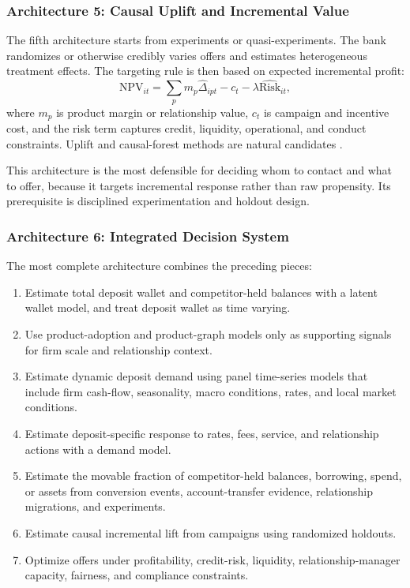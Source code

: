 \documentclass[11pt]{article}
\begin{document}
\subsubsection*{Architecture 5: Causal Uplift and Incremental Value}

The fifth architecture starts from experiments or quasi-experiments. The bank
randomizes or otherwise credibly varies offers and estimates heterogeneous
treatment effects. The targeting rule is then based on expected incremental
profit:
\[
  \mathrm{NPV}_{it}
  =
  \sum_p m_p \widehat{\Delta}_{ipt}
  - c_t
  - \lambda \widehat{\mathrm{Risk}}_{it},
\]
where $m_p$ is product margin or relationship value, $c_t$ is campaign and
incentive cost, and the risk term captures credit, liquidity, operational, and
conduct constraints. Uplift and causal-forest methods are natural candidates
\citep{lo2002true,radcliffe2007uplift,athey2016recursive,wager2018causalforests}.

This architecture is the most defensible for deciding whom to contact and what
to offer, because it targets incremental response rather than raw propensity.
Its prerequisite is disciplined experimentation and holdout design.

\subsubsection*{Architecture 6: Integrated Decision System}

The most complete architecture combines the preceding pieces:

\begin{enumerate}[leftmargin=*]
  \item Estimate total deposit wallet and competitor-held balances with a
  latent wallet model, and treat deposit wallet as time varying.
  \item Use product-adoption and product-graph models only as supporting
  signals for firm scale and relationship context.
  \item Estimate dynamic deposit demand using panel time-series models that
  include firm cash-flow, seasonality, macro conditions, rates, and local market
  conditions.
  \item Estimate deposit-specific response to rates, fees, service, and
  relationship actions with a demand model.
  \item Estimate the movable fraction of competitor-held balances, borrowing,
  spend, or assets from conversion events, account-transfer evidence,
  relationship migrations, and experiments.
  \item Estimate causal incremental lift from campaigns using randomized
  holdouts.
  \item Optimize offers under profitability, credit-risk, liquidity,
  relationship-manager capacity, fairness, and compliance constraints.
\end{enumerate}
\end{document}
